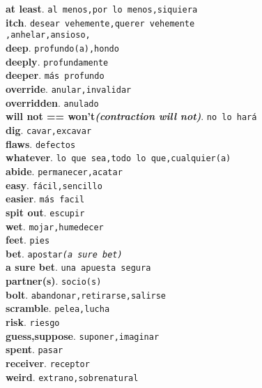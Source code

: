 \documentclass[twocolumn]{article}
\begin{document}
	\textsf{\textbf{at least}}. \texttt{al menos,por lo menos,siquiera}\\
	\textsf{\textbf{itch}}. \texttt{desear vehemente,querer vehemente\\,anhelar,ansioso,}\\
	\textsf{\textbf{deep}}. \texttt{profundo(a),hondo}\\
	\textsf{\textbf{deeply}}. \texttt{profundamente}\\
	\textsf{\textbf{deeper}}. \texttt{m\'as profundo}\\
	\textsf{\textbf{override}}. \texttt{anular,invalidar}\\
	\textsf{\textbf{overridden}}. \texttt{anulado}\\
	\textsf{\textbf{will not == won't{\scriptsize \textsl{(contraction will not)}}}}. \texttt{no lo har\'a}\\
	\textsf{\textbf{dig}}. \texttt{cavar,excavar}\\
	\textsf{\textbf{flaws}}. \texttt{defectos}\\
	\textsf{\textbf{whatever}}. \texttt{lo que sea,todo lo que,cualquier(a)}\\
	\textsf{\textbf{abide}}. \texttt{permanecer,acatar}\\
	\textsf{\textbf{easy}}. \texttt{f\'acil,sencillo}\\
	\textsf{\textbf{easier}}. \texttt{m\'as facil}\\
	\textsf{\textbf{spit out}}. \texttt{escupir}\\
	\textsf{\textbf{wet}}. \texttt{mojar,humedecer}\\
	\textsf{\textbf{feet}}. \texttt{pies}\\
	\textsf{\textbf{bet}}. \texttt{apostar{\scriptsize \textsl{(a sure bet)}}}\\
	\textsf{\textbf{a sure bet}}. \texttt{una apuesta segura}\\
	\textsf{\textbf{partner(s)}}. \texttt{socio(s)}\\
	\textsf{\textbf{bolt}}. \texttt{abandonar,retirarse,salirse}\\
	\textsf{\textbf{scramble}}. \texttt{pelea,lucha}\\
	\textsf{\textbf{risk}}. \texttt{riesgo}\\
	\textsf{\textbf{guess,suppose}}. \texttt{suponer,imaginar}\\
	\textsf{\textbf{spent}}. \texttt{pasar}\\
	\textsf{\textbf{receiver}}. \texttt{receptor}\\
	\textsf{\textbf{weird}}. \texttt{extrano,sobrenatural}\\
\end{document}
